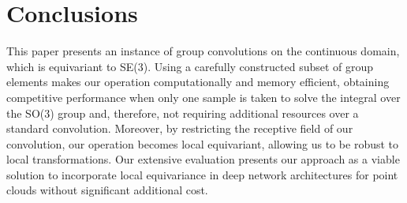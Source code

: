 \section{Conclusions}
\label{sec:conclusions}

This paper presents an instance of group convolutions on the continuous domain, which is equivariant to SE(3).
Using a carefully constructed subset of group elements makes our operation computationally and memory efficient, obtaining competitive performance when only one sample is taken to solve the integral over the SO(3) group and, therefore, not requiring additional resources over a standard convolution. 
Moreover, by restricting the receptive field of our convolution, our operation becomes local equivariant, allowing us to be robust to local transformations.
Our extensive evaluation presents our approach as a viable solution to incorporate local equivariance in deep network architectures for point clouds without significant additional cost.